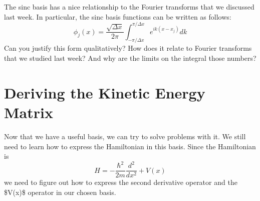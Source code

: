 \documentclass[letterpaper,10pt,english]{jupyterBook}
\begin{document}
\sphinxAtStartPar
The sinc basis has a nice relationship to the Fourier transforms that we discussed last week. In particular, the sinc basis functions can be written as follows:
\label{equation:Section4_v2:8e0743d5-9966-415b-bcd4-e9abe6576630}\begin{equation}
\phi_j(x) = \frac{\sqrt{\Delta x}}{2\pi} \int_{-\pi/\Delta x}^{\pi/\Delta x} e^{i k(x-x_j)} dk
\end{equation}
\sphinxAtStartPar
{} Can you justify this form qualitatively? How does it relate to Fourier transforms that we studied last week? And why are the limits on the integral those numbers?


\section{Deriving the Kinetic Energy Matrix}
\label{\detokenize{Section4_v2:deriving-the-kinetic-energy-matrix}}
\sphinxAtStartPar
Now that we have a useful basis, we can try to solve problems with it. We still need to learn how to express the Hamiltonian in this basis. Since the Hamiltonian is
\label{equation:Section4_v2:2db4dfb3-42a7-4875-b6f7-98f7eeee8a9b}\begin{equation}
H = -\frac{\hbar^2}{2m} \frac{d^2}{dx^2} + V(x)
\end{equation}
\sphinxAtStartPar
we need to figure out how to express the second derivative operator and the \$V(x)\$ operator in our chosen basis.
\end{document}
